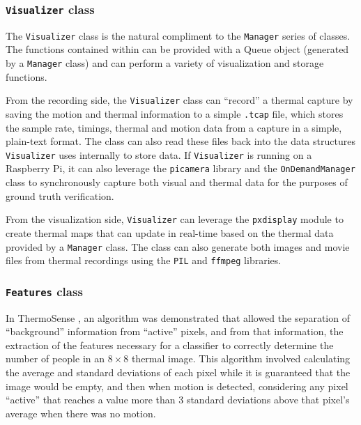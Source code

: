 \documentclass[../thesis/thesis.tex]{subfiles}
\begin{document}
\subsubsection*{\texttt{Visualizer} class}
The \texttt{Visualizer} class is the natural compliment to the \texttt{Manager} series of classes. The functions contained within can be provided with a Queue object (generated by a \texttt{Manager} class) and can perform a variety of visualization and storage functions.

From the recording side, the \texttt{Visualizer} class can ``record'' a thermal capture by saving the motion and thermal information to a simple \texttt{.tcap} file, which stores the sample rate, timings, thermal and motion data from a capture in a simple, plain-text format. The class can also read these files back into the data structures \texttt{Visualizer} uses internally to store data. If \texttt{Visualizer} is running on a Raspberry Pi, it can also leverage the \texttt{picamera} library and the \texttt{OnDemandManager} class to synchronously capture both visual and thermal data for the purposes of ground truth verification.

From the visualization side, \texttt{Visualizer} can leverage the \texttt{pxdisplay} module to create thermal maps that can update in real-time based on the thermal data provided by a \texttt{Manager} class. The class can also generate both images and movie files from thermal recordings using the \texttt{PIL} and \texttt{ffmpeg} libraries.

\subsubsection*{\texttt{Features} class}

In ThermoSense \cite{beltran2013thermosense}, an algorithm was demonstrated that allowed the separation of ``background'' information from ``active'' pixels, and from that information, the extraction of the features necessary for a classifier to correctly determine the number of people in an $8\times8$ thermal image. This algorithm involved calculating the average and standard deviations of each pixel while it is guaranteed that the image would be empty, and then when motion is detected, considering any pixel ``active'' that reaches a value more than 3 standard deviations above that pixel's average when there was no motion.
\end{document}
